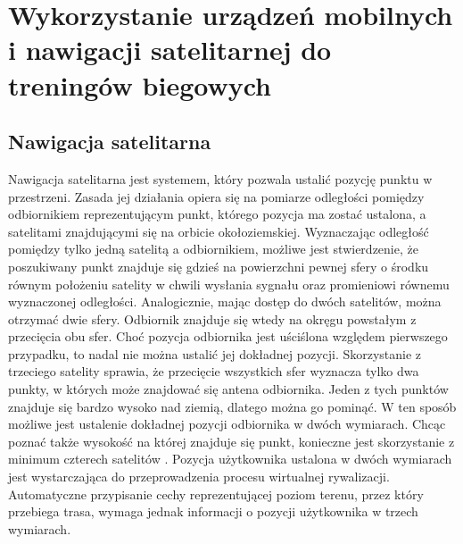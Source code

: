\chapter{Wykorzystanie urządzeń mobilnych i nawigacji satelitarnej do treningów biegowych}\label{chap:wykorzystanie_urzadzen_mobilnych}
\section{Nawigacja satelitarna}\label{section:nawigacja-satelitarna}
Nawigacja satelitarna jest systemem, który pozwala ustalić pozycję punktu w przestrzeni. Zasada jej działania opiera się na pomiarze odległości pomiędzy odbiornikiem reprezentującym punkt, którego pozycja ma zostać ustalona, a satelitami znajdującymi się na orbicie okołoziemskiej. Wyznaczając odległość pomiędzy tylko jedną satelitą a odbiornikiem, możliwe jest stwierdzenie, że poszukiwany punkt znajduje się gdzieś na powierzchni pewnej sfery o środku równym położeniu satelity w chwili wysłania sygnału oraz promieniowi równemu wyznaczonej odległości. Analogicznie, mając dostęp do dwóch satelitów, można otrzymać dwie sfery. Odbiornik znajduje się wtedy na okręgu powstałym z przecięcia obu sfer. Choć pozycja odbiornika jest uściślona względem pierwszego przypadku, to nadal nie można ustalić jej dokładnej pozycji. Skorzystanie z trzeciego satelity sprawia, że przecięcie wszystkich sfer wyznacza tylko dwa punkty, w których może znajdować się antena odbiornika. Jeden z tych punktów znajduje się bardzo wysoko nad ziemią, dlatego można go pominąć. W ten sposób możliwe jest ustalenie dokładnej pozycji odbiornika w dwóch wymiarach. Chcąc poznać także wysokość na której znajduje się punkt, konieczne jest skorzystanie z minimum czterech satelitów  \cite{gps2}. Pozycja użytkownika ustalona w dwóch wymiarach jest wystarczająca do przeprowadzenia procesu wirtualnej rywalizacji. Automatyczne przypisanie cechy reprezentującej poziom terenu, przez który przebiega trasa, wymaga jednak informacji o pozycji użytkownika w trzech wymiarach.

